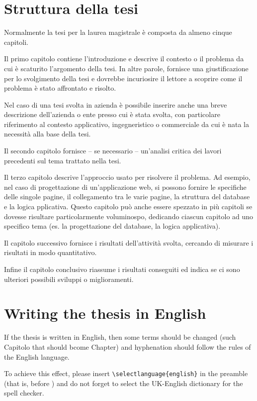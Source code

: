 \section{Struttura della tesi}

Normalmente la tesi per la laurea magistrale è composta da almeno cinque capitoli.

Il primo capitolo contiene l'introduzione e descrive il contesto o il problema da cui è scaturito l'argomento della tesi.
In altre parole, fornisce una giustificazione per lo svolgimento della tesi e dovrebbe incuriosire il lettore a scoprire come il problema è stato affrontato e risolto.

Nel caso di una tesi svolta in azienda è possibile inserire anche una breve descrizione dell'azienda o ente presso cui è stata svolta, con particolare riferimento al contesto applicativo, ingegneristico o commerciale da cui è nata la necessità alla base della tesi.

Il secondo capitolo fornisce -- se necessario -- un'analisi critica dei lavori precedenti sul tema trattato nella tesi.

Il terzo capitolo descrive l'approccio usato per risolvere il problema. Ad esempio, nel caso di progettazione di un'applicazione web, si possono fornire le specifiche delle singole pagine, il collegamento tra le varie pagine, la struttura del database e la logica pplicativa.
Questo capitolo può anche essere spezzato in più capitoli se dovesse risultare particolarmente voluminospo, dedicando ciascun capitolo ad uno specifico tema (es. la progettazione del database, la logica applicativa).

Il capitolo successivo fornisce i risultati dell'attività svolta, cercando di misurare i risultati in modo quantitativo.

Infine il capitolo conclusivo riassume i risultati conseguiti ed indica se ci sono ulteriori possibili sviluppi o miglioramenti.

\section{Writing the thesis in English}

If the thesis is written in English, then some terms should be changed (such Capitolo that should bcome Chapter) and hyphenation should follow the rules of the English language.

To achieve this effect, please insert \verb+\selectlanguage{english}+ in the preamble
(that is, before \verb++) and do not forget to select the UK-English dictionary for the spell checker.
